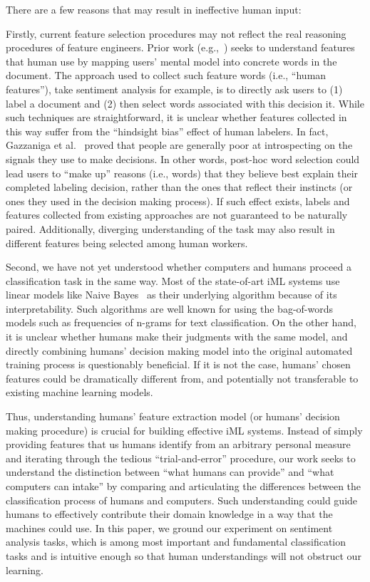 \documentclass[chi_draft]{sigchi}
\begin{document}
There are a few reasons that may result in ineffective human input: 

Firstly, current feature selection procedures may not reflect the real reasoning procedures of feature engineers.
Prior work (e.g.,~\cite{trivedi2015interactive}) seeks to understand features that human use by mapping users' mental model into concrete words in the document. The approach used to collect such feature words (i.e., ``human features''), take sentiment analysis for example, is to directly ask users to (1) label a document and (2) then select words associated with this decision it. 
While such techniques are straightforward, it is unclear whether features collected in this way suffer from the ``hindsight bias'' effect of human labelers. 
In fact, Gazzaniga et al.~\cite{gazzaniga2013integrated} proved that people are generally poor at introspecting on the signals they use to make decisions. In other words, post-hoc word selection could lead users to ``make up'' reasons (i.e., words) that they believe best explain their completed labeling decision, rather than the ones that reflect their instincts (or ones they used in the decision making process). If such effect exists, labels and features collected from existing approaches are not guaranteed to be naturally paired. Additionally, diverging understanding of the task may also result in different features being selected among human workers.

Second, we have not yet understood whether computers and humans proceed a classification task in the same way. 
Most of the state-of-art iML systems use linear models like Naive Bayes~\cite{kulesza2015principles, kulesza2011oriented, amershi2012regroup} as their underlying algorithm because of its interpretability.
Such algorithms are well known for using the bag-of-words models such as frequencies of n-grams for text classification. On the other hand, it is unclear whether humans make their judgments with the same model, and directly combining humans' decision making model into the original automated training process is questionably beneficial. If it is not the case, humans' chosen features could be dramatically different from, and potentially not transferable to existing machine learning models.

Thus, understanding humans' feature extraction model (or humans' decision making procedure) is crucial for building effective iML systems. Instead of simply providing features that us humans identify from an arbitrary personal measure and iterating through the tedious ``trial-and-error'' procedure, our work seeks to understand the distinction between ``what humans can provide'' and ``what computers can intake'' by comparing and articulating the differences between the classification process of humans and computers. Such understanding could guide humans to effectively contribute their domain knowledge in a way that the machines could use. In this paper, we ground our experiment on sentiment analysis tasks, which is among most important and fundamental classification tasks and is intuitive enough so that human understandings will not obstruct our learning.
\end{document}
